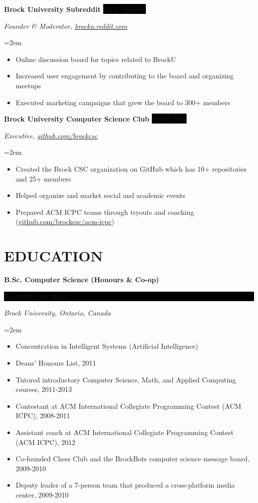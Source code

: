 \documentclass[paper=a4,fontsize=11pt]{scrartcl} %
\newcommand{\sepspace}{\vspace*{1em}}     %
\newcommand{\NewPart}[1]{\section*{\uppercase{#1}}}
\newcommand{\EducationEntry}[4]{
    \noindent \textbf{#1} \hfill        %
    \colorbox{Black}{
      \parbox{8.5em}{
      \hfill\color{White}#2}} \par      %
    \noindent \textit{#3} \par          %
    \noindent\hangindent=2em\hangafter=0 \small #4 %
    \normalsize \par}
\newcommand{\OrganizationEntry}[4]{         %
    \noindent \textbf{#1} \hfill            %
    \colorbox{Black}{\color{White}#2} \par  %
    \noindent \textit{#3} \par              %
    \noindent\hangindent=2em\hangafter=0 \small #4 %
    \normalsize \par}
\begin{document}
\OrganizationEntry{Brock University Subreddit}{2011 - present}
{Founder \& Moderator, \href{https://brocku.reddit.com/}{brocku.reddit.com}}
{
 \begin{itemize} \itemsep -1pt
   \item Online discussion board for topics related to BrockU
   \item Increased user engagement by contributing to the board and organizing meetups
   \item Executed marketing campaigns that grew the board to 300+ members
 \end{itemize}
}
\sepspace

\OrganizationEntry{Brock University Computer Science Club}{2009 - 2013}
{Executive, \href{https://github.com/brockcsc}{github.com/brockcsc}}
{
 \begin{itemize} \itemsep -1pt
   \item Created the Brock CSC organization on GitHub which has 10+ repositories and 25+ members
   \item Helped organize and market social and academic events
   \item Prepared ACM ICPC teams through tryouts and coaching (\url{github.com/brockcsc/acm-icpc})
 \end{itemize}
}

\NewPart{Education}{}

\EducationEntry{B.Sc. Computer Science (Honours \& Co-op)}
{Sep 2007 - Oct 2013}
{Brock University, Ontario, Canada}
{
\begin{itemize}  \itemsep -1pt
  \item Concentration in Intelligent Systems (Artificial Intelligence)
  \item Deans' Honours List, 2011
  \item Tutored introductory Computer Science, Math, and Applied Computing courses, 2011-2013
  \item Contestant at ACM International Collegiate Programming Contest (ACM ICPC), 2008-2011
  \item Assistant coach at ACM International Collegiate Programming Contest (ACM ICPC), 2012
  \item Co-founded Chess Club and the BrockBots computer science
  message board, 2009-2010
  \item Deputy leader of a 7-person team that produced a cross-platform media center, 2009-2010
\end{itemize}
}
\end{document}
